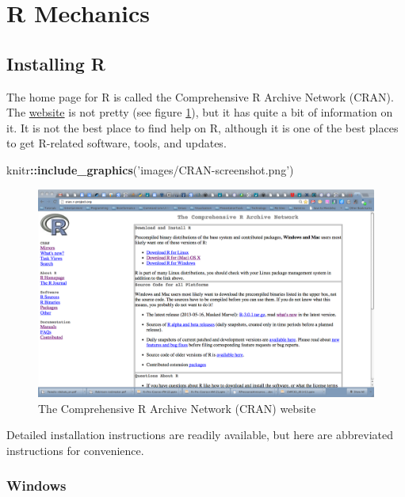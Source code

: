 \documentclass[]{article}
\newenvironment{Shaded}{\begin{snugshade}}{\end{snugshade}}
\newcommand{\KeywordTok}[1]{\textcolor[rgb]{0.13,0.29,0.53}{\textbf{#1}}}
\newcommand{\StringTok}[1]{\textcolor[rgb]{0.31,0.60,0.02}{#1}}
\newcommand{\OperatorTok}[1]{\textcolor[rgb]{0.81,0.36,0.00}{\textbf{#1}}}
\newcommand{\NormalTok}[1]{#1}
\theoremstyle{definition}
\theoremstyle{definition}
\theoremstyle{remark}
\begin{document}
\section{R Mechanics}\label{r-mechanics}

\subsection{Installing R}\label{installing-r}

The home page for R is called the Comprehensive R Archive Network
(CRAN). The \href{http://cran.r-project.or}{website} is not pretty (see
figure \ref{fig:cranscreenshot}), but it has quite a bit of information
on it. It is not the best place to find help on R, although it is one of
the best places to get R-related software, tools, and updates.

\begin{Shaded}
\begin{Highlighting}[]
\NormalTok{knitr}\OperatorTok{::}\KeywordTok{include_graphics}\NormalTok{(}\StringTok{'images/CRAN-screenshot.png'}\NormalTok{)}
\end{Highlighting}
\end{Shaded}

\begin{figure}
\includegraphics[width=20.28in]{images/CRAN-screenshot} \caption{The Comprehensive R Archive Network (CRAN) website}\label{fig:cranscreenshot}
\end{figure}

Detailed installation instructions are readily available, but here are
abbreviated instructions for convenience.

\subsubsection{Windows}\label{windows}
\end{document}
